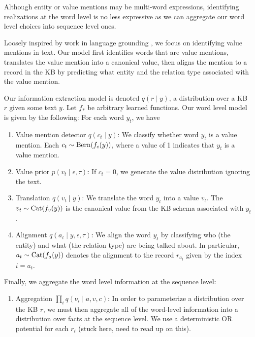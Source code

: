 \documentclass[12pt]{article}
\begin{document}
Although entity or value mentions may be multi-word expressions,
identifying realizations at the word level is no less expressive as
we can aggregate our word level choices into sequence level ones.

Loosely inspired by work in language grounding \cite{liang2009},
we focus on identifying value mentions in text.
Our model first identifies words that are value mentions,
translates the value mention into a canonical value,
then aligns the mention to a record in the KB by predicting what
entity and the relation type associated with the value mention.

Our information extraction model is denoted $q(r \mid y)$,
a distribution over a KB $r$ given some text $y$.
Let $f_{*}$ be arbitrary learned functions.
Our word level model is given by the following:
For each word $y_t$, we have
\begin{enumerate}
\item Value mention detector $q(c_t \mid y)$: We classify whether word $y_t$
   is a value mention. Each $c_t \sim \mathrm{Bern}(f_{c}(y))$, where a value of 1 indicates
   that $y_t$ is a value mention.
\item Value prior $p(v_t \mid \epsilon, \tau)$: If $c_t = 0$,
    we generate the value distribution ignoring the text.
\item Translation $q(v_t \mid y)$: We translate the word $y_t$ into a value $v_t$.
    The $v_t \sim \mathrm{Cat}(f_{v}(y))$ is the canonical value from the KB schema 
    associated with $y_t$.
\item Alignment $q(a_t \mid y, \epsilon, \tau)$:
    We align the word $y_t$ by classifying who (the entity)
    and what (the relation type) are being talked about.
    In particular, $a_t\sim\mathrm{Cat}(f_{a}(y))$ denotes the alignment to the record $r_{a_t}$
    given by the index $i = a_t$. 
\end{enumerate}

Finally, we aggregate the word level information at the sequence level:
\begin{enumerate}
\item Aggregation $\prod_i q(\nu_i \mid a,v,c)$:
    In order to parameterize a distribution over the KB $r$,
    we must then aggregate all of the word-level information into a distribution over
    facts at the sequence level.
    We use a deterministic OR potential for each $r_i$ (stuck here, need to read up on this).
\end{enumerate}
\end{document}
